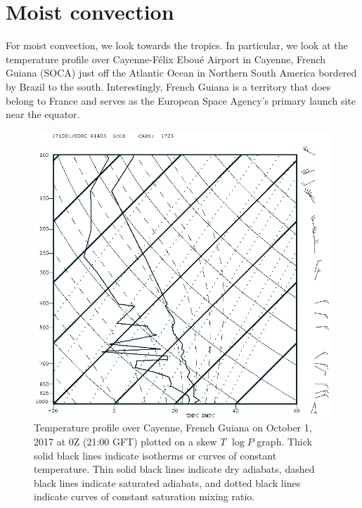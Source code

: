 \documentclass[11pt]{article}
\begin{document}
\section{Moist convection}
For moist convection, we look towards the tropics. In particular, we look at the temperature profile over Cayenne-Félix Eboué Airport in Cayenne, French Guiana (SOCA) just off the Atlantic Ocean in Northern South America bordered by Brazil to the south. Interestingly, French Guiana is a territory that does belong to France and serves as the European Space Agency's primary launch site near the equator.

\begin{figure}[h!]
  \centering
  \includegraphics[width=\textwidth]{SOCAMoist0Z.png}
  \caption{Temperature profile over Cayenne, French Guiana on October 1, 2017 at 0Z (21:00 GFT) plotted on a skew $T$ $\log P$ graph. Thick solid black lines indicate isotherms or curves of constant temperature. Thin solid black lines indicate dry adiabats, dashed black lines indicate saturated adiabats, and dotted black lines indicate curves of constant saturation mixing ratio.}
  \label{fig:SOCA0Z}
\end{figure}
\end{document}
